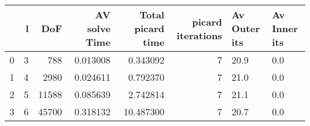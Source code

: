 \begin{tabular}{lrrrrrll}
\toprule
{} &  l &    DoF &  AV solve Time &  Total picard time &  picard iterations & Av Outer its & Av Inner its \\
\midrule
0 &  3 &    788 &       0.013008 &           0.343092 &                  7 &         20.9 &          0.0 \\
1 &  4 &   2980 &       0.024611 &           0.792370 &                  7 &         21.0 &          0.0 \\
2 &  5 &  11588 &       0.085639 &           2.742814 &                  7 &         21.1 &          0.0 \\
3 &  6 &  45700 &       0.318132 &          10.487300 &                  7 &         20.7 &          0.0 \\
\bottomrule
\end{tabular}
